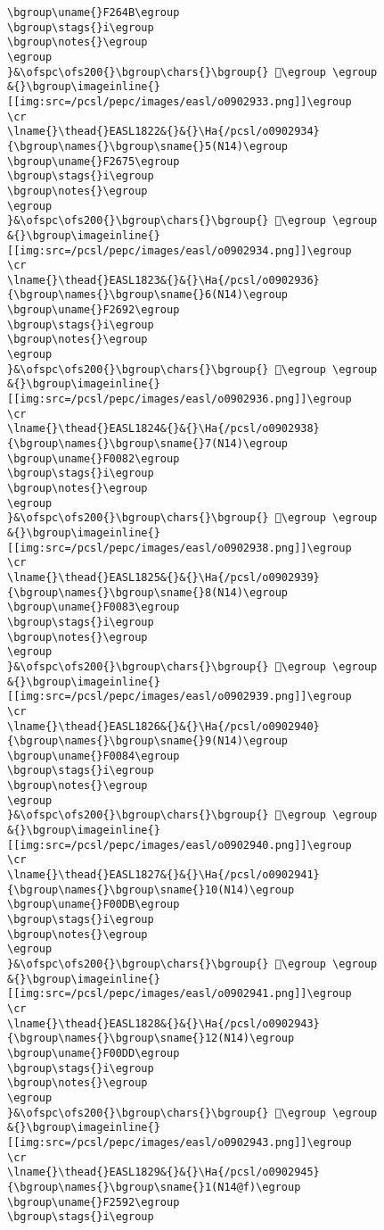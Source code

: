 \begin{verbatim}
\bgroup\uname{}F264B\egroup
\bgroup\stags{}i\egroup
\bgroup\notes{}\egroup
\egroup
}&\ofspc\ofs200{}\bgroup\chars{}\bgroup{} 󲙋\egroup \egroup
&{}\bgroup\imageinline{}[[img:src=/pcsl/pepc/images/easl/o0902933.png]]\egroup
\cr
\lname{}\thead{}EASL1822&{}&{}\Ha{/pcsl/o0902934}{\bgroup\names{}\bgroup\sname{}5(N14)\egroup
\bgroup\uname{}F2675\egroup
\bgroup\stags{}i\egroup
\bgroup\notes{}\egroup
\egroup
}&\ofspc\ofs200{}\bgroup\chars{}\bgroup{} 󲙵\egroup \egroup
&{}\bgroup\imageinline{}[[img:src=/pcsl/pepc/images/easl/o0902934.png]]\egroup
\cr
\lname{}\thead{}EASL1823&{}&{}\Ha{/pcsl/o0902936}{\bgroup\names{}\bgroup\sname{}6(N14)\egroup
\bgroup\uname{}F2692\egroup
\bgroup\stags{}i\egroup
\bgroup\notes{}\egroup
\egroup
}&\ofspc\ofs200{}\bgroup\chars{}\bgroup{} 󲚒\egroup \egroup
&{}\bgroup\imageinline{}[[img:src=/pcsl/pepc/images/easl/o0902936.png]]\egroup
\cr
\lname{}\thead{}EASL1824&{}&{}\Ha{/pcsl/o0902938}{\bgroup\names{}\bgroup\sname{}7(N14)\egroup
\bgroup\uname{}F0082\egroup
\bgroup\stags{}i\egroup
\bgroup\notes{}\egroup
\egroup
}&\ofspc\ofs200{}\bgroup\chars{}\bgroup{} 󰂂\egroup \egroup
&{}\bgroup\imageinline{}[[img:src=/pcsl/pepc/images/easl/o0902938.png]]\egroup
\cr
\lname{}\thead{}EASL1825&{}&{}\Ha{/pcsl/o0902939}{\bgroup\names{}\bgroup\sname{}8(N14)\egroup
\bgroup\uname{}F0083\egroup
\bgroup\stags{}i\egroup
\bgroup\notes{}\egroup
\egroup
}&\ofspc\ofs200{}\bgroup\chars{}\bgroup{} 󰂃\egroup \egroup
&{}\bgroup\imageinline{}[[img:src=/pcsl/pepc/images/easl/o0902939.png]]\egroup
\cr
\lname{}\thead{}EASL1826&{}&{}\Ha{/pcsl/o0902940}{\bgroup\names{}\bgroup\sname{}9(N14)\egroup
\bgroup\uname{}F0084\egroup
\bgroup\stags{}i\egroup
\bgroup\notes{}\egroup
\egroup
}&\ofspc\ofs200{}\bgroup\chars{}\bgroup{} 󰂄\egroup \egroup
&{}\bgroup\imageinline{}[[img:src=/pcsl/pepc/images/easl/o0902940.png]]\egroup
\cr
\lname{}\thead{}EASL1827&{}&{}\Ha{/pcsl/o0902941}{\bgroup\names{}\bgroup\sname{}10(N14)\egroup
\bgroup\uname{}F00DB\egroup
\bgroup\stags{}i\egroup
\bgroup\notes{}\egroup
\egroup
}&\ofspc\ofs200{}\bgroup\chars{}\bgroup{} 󰃛\egroup \egroup
&{}\bgroup\imageinline{}[[img:src=/pcsl/pepc/images/easl/o0902941.png]]\egroup
\cr
\lname{}\thead{}EASL1828&{}&{}\Ha{/pcsl/o0902943}{\bgroup\names{}\bgroup\sname{}12(N14)\egroup
\bgroup\uname{}F00DD\egroup
\bgroup\stags{}i\egroup
\bgroup\notes{}\egroup
\egroup
}&\ofspc\ofs200{}\bgroup\chars{}\bgroup{} 󰃝\egroup \egroup
&{}\bgroup\imageinline{}[[img:src=/pcsl/pepc/images/easl/o0902943.png]]\egroup
\cr
\lname{}\thead{}EASL1829&{}&{}\Ha{/pcsl/o0902945}{\bgroup\names{}\bgroup\sname{}1(N14@f)\egroup
\bgroup\uname{}F2592\egroup
\bgroup\stags{}i\egroup

\end{verbatim}
